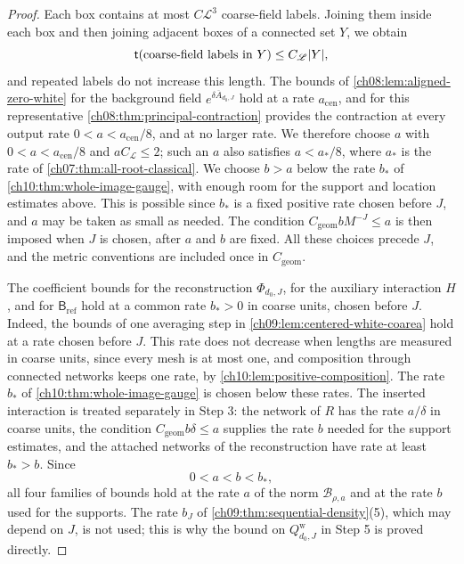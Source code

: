 \begin{proof}
Each box contains at most $C\mathscr L^3$ coarse-field labels. Joining them inside each box and then joining adjacent boxes of a connected set $Y$, we obtain
\[
 \mathsf t(\text{coarse-field labels in }Y)\le C_{\mathscr L}\lvert Y\rvert,
\]
and repeated labels do not increase this length. The bounds of \cref{ch08:lem:aligned-zero-white} for the background field $e^{\delta\overline A_{d_0,J}}$ hold at a rate $a_{\mathrm{cen}}$, and for this representative \cref{ch08:thm:principal-contraction} provides the contraction at every output rate $0<a<a_{\mathrm{cen}}/8$, and at no larger rate. We therefore choose $a$ with $0<a<a_{\mathrm{cen}}/8$ and $aC_{\mathscr L}\le2$; such an $a$ also satisfies $a<a_*/8$, where $a_*$ is the rate of \cref{ch07:thm:all-root-classical}. We choose $b>a$ below the rate $b_*$ of \cref{ch10:thm:whole-image-gauge}, with enough room for the support and location estimates above. This is possible since $b_*$ is a fixed positive rate chosen before $J$, and $a$ may be taken as small as needed. The condition $C_{\mathrm{geom}}bM^{-J}\le a$ is then imposed when $J$ is chosen, after $a$ and $b$ are fixed. All these choices precede $J$, and the metric conventions are included once in $C_{\mathrm{geom}}$.

The coefficient bounds for the reconstruction $\Phi_{d_0,J}$, for the auxiliary interaction $H$, and for $\mathsf B_{\mathrm{ref}}$ hold at a common rate $b_*>0$ in coarse units, chosen before $J$. Indeed, the bounds of one averaging step in \cref{ch09:lem:centered-white-coarea} hold at a rate chosen before $J$. This rate does not decrease when lengths are measured in coarse units, since every mesh is at most one, and composition through connected networks keeps one rate, by \cref{ch10:lem:positive-composition}. The rate $b_*$ of \cref{ch10:thm:whole-image-gauge} is chosen below these rates. The inserted interaction is treated separately in Step 3: the network of $R$ has the rate $a/\delta$ in coarse units, the condition $C_{\mathrm{geom}}b\delta\le a$ supplies the rate $b$ needed for the support estimates, and the attached networks of the reconstruction have rate at least $b_*>b$. Since
\[
 0<a<b<b_*,
\]
all four families of bounds hold at the rate $a$ of the norm $\mathcal B_{\rho,a}$ and at the rate $b$ used for the supports. The rate $b_J$ of \cref{ch09:thm:sequential-density}(5), which may depend on $J$, is not used; this is why the bound on $Q_{d_0,J}^{\mathrm w}$ in Step 5 is proved directly.


\end{proof}
